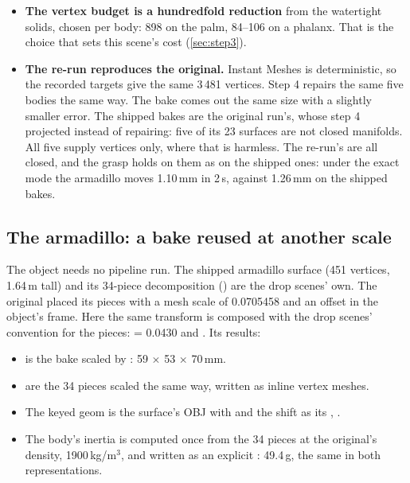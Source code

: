 \begin{itemize}
\item \textbf{The vertex budget is a hundredfold reduction} from the watertight solids, chosen per body: 898 on the palm, 84--106 on a phalanx. That is the choice that sets this scene's cost (\cref{sec:step3}).
\item \textbf{The re-run reproduces the original.} Instant Meshes is deterministic, so the recorded targets give the same 3\,481 vertices. Step 4 repairs the same five bodies the same way. The bake comes out the same size with a slightly smaller error. The shipped bakes are the original run's, whose step 4 projected instead of repairing: five of its 23 surfaces are not closed manifolds. All five supply vertices only, where that is harmless. The re-run's are all closed, and the grasp holds on them as on the shipped ones: under the exact mode the armadillo moves 1.10\,mm in 2\,s, against 1.26\,mm on the shipped bakes.
\end{itemize}

\subsection{The armadillo: a bake reused at another scale}\label{sec:exarm}

The object needs no pipeline run. The shipped armadillo surface (451 vertices, 1.64\,m tall) and its 34-piece decomposition () are the drop scenes' own. The original placed its pieces with a mesh scale of 0.0705458 and an offset in the object's frame. Here the same transform is composed with the drop scenes' convention for the pieces:  = 0.0430 and . Its results:

\begin{itemize}
\item {} is the bake scaled by : 59 $\times$ 53 $\times$ 70\,mm.
\item {} are the 34 pieces scaled the same way, written as inline vertex meshes.
\item The keyed geom is the surface's OBJ with  and the shift as its , .
\item The body's inertia is computed once from the 34 pieces at the original's density, 1900\,kg/m$^3$, and written as an explicit : 49.4\,g, the same in both representations.
\end{itemize}


